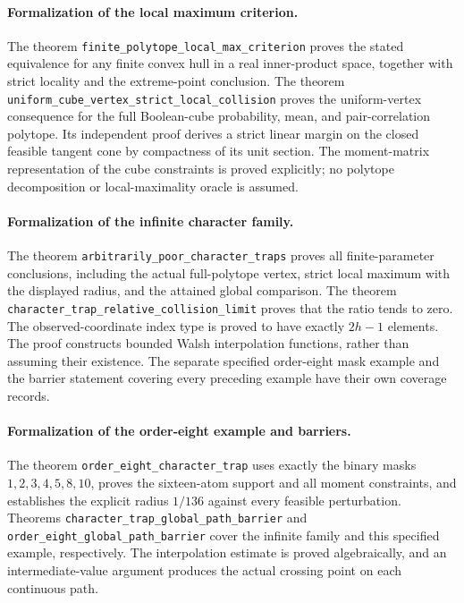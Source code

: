 \paragraph{Formalization of the local maximum criterion.} The theorem \texttt{finite\_\allowbreak polytope\_\allowbreak local\_\allowbreak max\_\allowbreak criterion} proves the stated equivalence for any finite convex hull in a real inner-product space, together with strict locality and the extreme-point conclusion. The theorem \texttt{uniform\_\allowbreak cube\_\allowbreak vertex\_\allowbreak strict\_\allowbreak local\_\allowbreak collision} proves the uniform-vertex consequence for the full Boolean-cube probability, mean, and pair-correlation polytope. Its independent proof derives a strict linear margin on the closed feasible tangent cone by compactness of its unit section. The moment-matrix representation of the cube constraints is proved explicitly; no polytope decomposition or local-maximality oracle is assumed.

\paragraph{Formalization of the infinite character family.} The theorem \texttt{arbitrarily\_\allowbreak poor\_\allowbreak character\_\allowbreak traps} proves all finite-parameter conclusions, including the actual full-polytope vertex, strict local maximum with the displayed radius, and the attained global comparison. The theorem \texttt{character\_\allowbreak trap\_\allowbreak relative\_\allowbreak collision\_\allowbreak limit} proves that the ratio tends to zero. The observed-coordinate index type is proved to have exactly $2h-1$ elements. The proof constructs bounded Walsh interpolation functions, rather than assuming their existence. The separate specified order-eight mask example and the barrier statement covering every preceding example have their own coverage records.

\paragraph{Formalization of the order-eight example and barriers.} The theorem \texttt{order\_\allowbreak eight\_\allowbreak character\_\allowbreak trap} uses exactly the binary masks $1,2,3,4,5,8,10$, proves the sixteen-atom support and all moment constraints, and establishes the explicit radius $1/136$ against every feasible perturbation. Theorems \texttt{character\_\allowbreak trap\_\allowbreak global\_\allowbreak path\_\allowbreak barrier} and \texttt{order\_\allowbreak eight\_\allowbreak global\_\allowbreak path\_\allowbreak barrier} cover the infinite family and this specified example, respectively. The interpolation estimate is proved algebraically, and an intermediate-value argument produces the actual crossing point on each continuous path.

